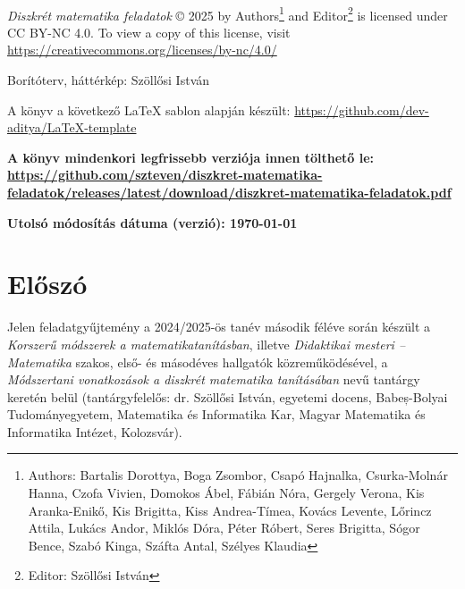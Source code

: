 \documentclass[magyar]{package/fancy-book}
\begin{document}
	


\newpage
\thispagestyle{plain}
~
\vfill

\noindent \emph{Diszkrét matematika feladatok} \copyright{} 2025 by Authors\footnote{Authors: Bartalis Dorottya, Boga Zsombor, Csapó Hajnalka, Csurka-Molnár Hanna, Czofa Vivien, Domokos Ábel, Fábián Nóra, Gergely Verona, Kis Aranka-Enikő, Kis Brigitta, Kiss Andrea-Tímea, Kovács Levente, Lőrincz Attila, Lukács Andor, Miklós Dóra, Péter Róbert, Seres Brigitta, Sógor Bence, Szabó Kinga, Száfta Antal, Szélyes Klaudia} and Editor\footnote{Editor: Szöllősi István} is licensed under CC BY-NC 4.0. To view a copy of this license, visit \url{https://creativecommons.org/licenses/by-nc/4.0/}

\vspace*{2em}

\noindent Borítóterv, háttérkép: Szöllősi István

\noindent A könyv a következő \LaTeX{} sablon alapján készült: \url{https://github.com/dev-aditya/LaTeX-template}

\vspace*{2em}

\noindent \textbf{A könyv mindenkori legfrissebb verziója innen tölthető le:\\ \url{https://github.com/szteven/diszkret-matematika-feladatok/releases/latest/download/diszkret-matematika-feladatok.pdf}}

\vspace*{3em}

{\large\noindent\textbf{Utolsó módosítás dátuma (verzió): \version\today}}

\vspace*{1em}



\newpage

\tableofcontents

\chapter*{Előszó}
\thispagestyle{plain}

Jelen feladatgyűjtemény a 2024/2025-ös tanév második féléve során
készült a \emph{Korszerű módszerek a matematikatanításban}, illetve
\emph{Didaktikai mesteri -- Matematika} szakos, első- és másodéves
hallgatók közreműködésével, a \emph{Módszertani vonatkozások a diszkrét
matematika tanításában} nevű tantárgy keretén belül (tantárgyfelelős:
dr. Szöllősi István, egyetemi docens, Babeș-Bolyai Tudományegyetem, Matematika és Informatika
Kar, Magyar Matematika és Informatika Intézet, Kolozsvár). 
\end{document}

